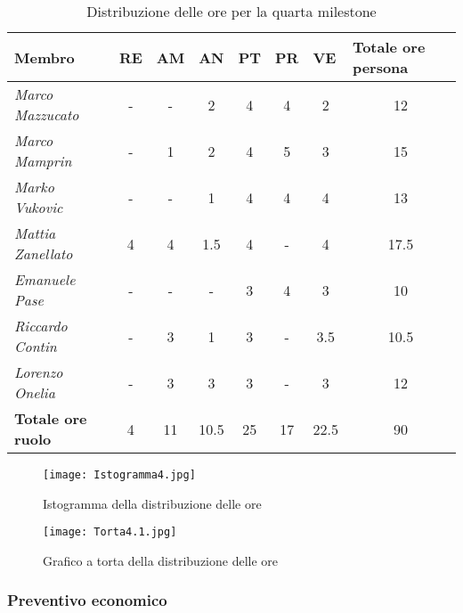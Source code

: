 \begin{table}[H]
    \centering
    \begin{tabular}{|l|c|c|c|c|c|c|c|}
    \hline
    \textbf{Membro} & \multicolumn{1}{l|}{\textbf{RE}} & \multicolumn{1}{l|}{\textbf{AM}} & \multicolumn{1}{l|}{\textbf{AN}} & \multicolumn{1}{l|}{\textbf{PT}} & \multicolumn{1}{l|}{\textbf{PR}} & \multicolumn{1}{l|}{\textbf{VE}} & \multicolumn{1}{l|}{\textbf{Totale ore persona}} \\ \hline
    \textit{Marco Mazzucato}  & - & -   & 2     & 4  & 4   & 2    & 12     \\ \hline
    \textit{Marco Mamprin}    & - & 1   & 2     & 4  & 5   & 3    & 15     \\ \hline
    \textit{Marko Vukovic}    & - & -   & 1     & 4  & 4   & 4    & 13     \\ \hline
    \textit{Mattia Zanellato} & 4 & 4   & 1.5   & 4  & -   & 4    & 17.5   \\ \hline
    \textit{Emanuele Pase}    & - & -   & -     & 3  & 4   & 3    & 10     \\ \hline
    \textit{Riccardo Contin}  & - & 3   & 1     & 3  & -   & 3.5  & 10.5   \\ \hline
    \textit{Lorenzo Onelia}   & - & 3   & 3     & 3  & -   & 3    & 12     \\ \hline
    \textbf{Totale ore ruolo} & 4 & 11  & 10.5  & 25 & 17  & 22.5 & 90     \\ \hline
    \end{tabular}
    \caption{Distribuzione delle ore per la quarta milestone}
\end{table}

\begin{figure}[H]
    \texttt{[image: Istogramma4.jpg]}
    \caption{Istogramma della distribuzione delle ore}
\end{figure}

\begin{figure}[H]
    \texttt{[image: Torta4.1.jpg]}
    \caption{Grafico a torta della distribuzione delle ore}
\end{figure}

\newpage
\subsubsection{Preventivo economico}

